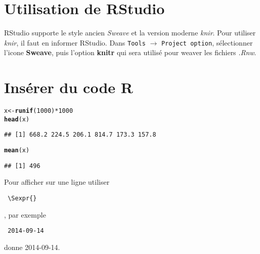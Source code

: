 \documentclass[a4paper]{article}\usepackage[]{graphicx}\usepackage[]{color}
\makeatletter
\newcommand{\hlnum}[1]{\textcolor[rgb]{0.686,0.059,0.569}{#1}}%
\newcommand{\hlopt}[1]{\textcolor[rgb]{0,0,0}{#1}}%
\newcommand{\hlstd}[1]{\textcolor[rgb]{0.345,0.345,0.345}{#1}}%
\newcommand{\hlkwb}[1]{\textcolor[rgb]{0.69,0.353,0.396}{#1}}%
\newcommand{\hlkwd}[1]{\textcolor[rgb]{0.737,0.353,0.396}{\textbf{#1}}}%
\newenvironment{kframe}{%
 \def\at@end@of@kframe{}%
 \ifinner\ifhmode%
  \def\at@end@of@kframe{\end{minipage}}%
  \begin{minipage}{\columnwidth}%
 \fi\fi%
 \def\FrameCommand##1{\hskip\@totalleftmargin \hskip-\fboxsep
 \colorbox{shadecolor}{##1}\hskip-\fboxsep
     \hskip-\linewidth \hskip-\@totalleftmargin \hskip\columnwidth}%
 \MakeFramed {\advance\hsize-\width
   \@totalleftmargin\z@ \linewidth\hsize
   \@setminipage}}%
 {\par\unskip\endMakeFramed%
 \at@end@of@kframe}
\newenvironment{knitrout}{}{} %
\makeatother
\begin{document}
\section{Utilisation de RStudio}

RStudio supporte le style ancien \emph{Sweave} et la version moderne \emph{knir}. Pour utiliser \emph{knir}, il faut en informer RStudio.
Dans \texttt{Tools} $\longrightarrow$ \texttt{Project option}, sélectionner l'icone \textbf{Sweave}, puis l'option \textbf{knitr} qui sera utilisé pour weaver les fichiers \emph{.Rnw}.

\section{Insérer du code R}

\begin{knitrout}
\color{fgcolor}\begin{kframe}
\begin{alltt}
\hlstd{x} \hlkwb{<-} \hlkwd{runif}\hlstd{(}\hlnum{1000}\hlstd{)} \hlopt{*} \hlnum{1000}
\hlkwd{head}\hlstd{(x)}
\end{alltt}
\begin{verbatim}
## [1] 668.2 224.5 206.1 814.7 173.3 157.8
\end{verbatim}
\begin{alltt}
\hlkwd{mean}\hlstd{(x)}
\end{alltt}
\begin{verbatim}
## [1] 496
\end{verbatim}
\end{kframe}
\end{knitrout}

Pour afficher sur une ligne utiliser \begin{verbatim} \Sexpr{} \end{verbatim}, par exemple \begin{verbatim} 2014-09-14 \end{verbatim} donne 2014-09-14.
\end{document}
